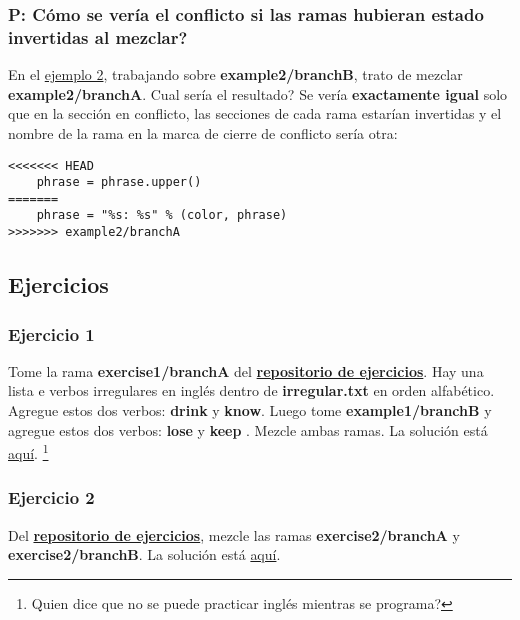 \subsubsection{P: Cómo se vería el conflicto si las ramas hubieran estado invertidas al mezclar?}
En el \hyperref[example_02]{ejemplo 2}, trabajando sobre {\bf example2/branchB}, trato de mezclar {\bf example2/branchA}.
Cual sería el resultado?
Se vería {\bf exactamente igual} solo que en la sección en conflicto, las secciones de cada rama estarían invertidas
 y el nombre de la rama en la marca de cierre de conflicto sería otra:

\begin{lstlisting}[style=python_style, firstnumber=11, caption={\bf ejemplo 2} - conflicto invertido]
<<<<<<< HEAD
    phrase = phrase.upper()
=======
    phrase = "%s: %s" % (color, phrase)
>>>>>>> example2/branchA
\end{lstlisting}

\subsection{Ejercicios}
\subsubsection{Ejercicio 1}
Tome la rama {\bf exercise1/branchA } del \hyperref[exercises_repo]{\bf repositorio de ejercicios}. Hay una lista
e verbos irregulares en inglés dentro de {\bf irregular.txt} en orden alfabético. Agregue estos dos verbos: {\bf drink} y {\bf know}.
Luego tome {\bf example1/branchB } y agregue estos dos verbos: {\bf lose } y {\bf keep }. Mezcle ambas ramas. La solución está
\hyperref[exercise_01]{aquí}. \footnote{ Quien dice que no se puede practicar inglés mientras se programa? }

\subsubsection{Ejercicio 2}
Del \hyperref[exercises_repo]{\bf repositorio de ejercicios}, mezcle las ramas {\bf exercise2/branchA} y {\bf exercise2/branchB}.
La solución está \hyperref[exercise_02]{aquí}.
